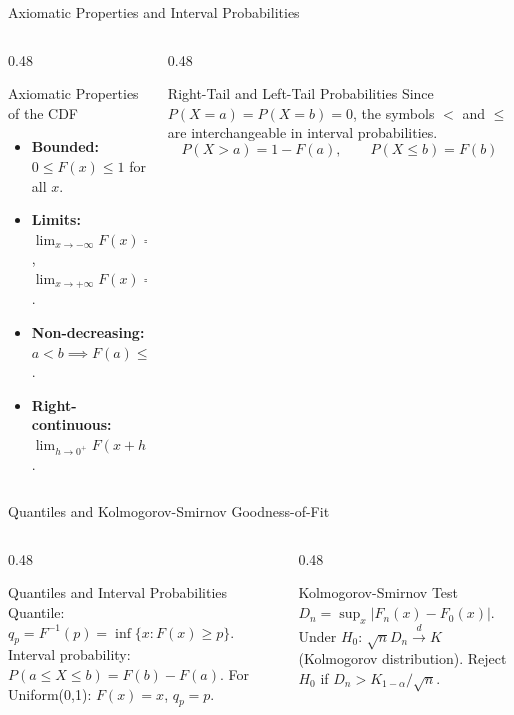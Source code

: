 \documentclass[aspectratio=169,xcolor={dvipsnames,table}]{beamer}
\begin{document}
\begin{frame}{Axiomatic Properties and Interval Probabilities}
	\vspace{-0.15cm}
	\begin{columns}[T]
		\begin{column}{0.48\textwidth}
			\begin{alertblock}{Axiomatic Properties of the CDF}
				\footnotesize
				\begin{itemize}\itemsep=0.03cm
					\item \textbf{Bounded:} $0 \le F(x) \le 1$ for all $x$.
					\item \textbf{Limits:} $\lim_{x \to -\infty} F(x) = 0$, $\lim_{x \to +\infty} F(x) = 1$.
					\item \textbf{Non-decreasing:} $a < b \implies F(a) \le F(b)$.
					\item \textbf{Right-continuous:} $\lim_{h \to 0^{+}} F(x+h) = F(x)$.
				\end{itemize}
			\end{alertblock}
		\end{column}
		\begin{column}{0.48\textwidth}
			\begin{block}{Right-Tail and Left-Tail Probabilities}
				\footnotesize
				Since $P(X=a)=P(X=b)=0$, the symbols $<$ and $\le$ are interchangeable in interval probabilities.
				$$P(X > a) = 1 - F(a), \qquad P(X \le b) = F(b)$$
			\end{block}
		\end{column}
	\end{columns}
\end{frame}

\begin{frame}{Quantiles and Kolmogorov-Smirnov Goodness-of-Fit}
	\vspace{-0.15cm}
	\begin{columns}[T]
		\begin{column}{0.48\textwidth}
			\begin{block}{Quantiles and Interval Probabilities}
				\footnotesize
				Quantile: $q_{p} = F^{-1}(p) = \inf\{x : F(x) \ge p\}$. Interval probability: $P(a \le X \le b) = F(b) - F(a)$. For Uniform(0,1): $F(x) = x$, $q_{p} = p$.
			\end{block}
		\end{column}
		\begin{column}{0.48\textwidth}
			\begin{alertblock}{Kolmogorov-Smirnov Test}
				\footnotesize
				$D_{n} = \sup_{x} |F_{n}(x) - F_{0}(x)|$. Under $H_{0}$: $\sqrt{n} D_{n} \xrightarrow{d} K$ (Kolmogorov distribution). Reject $H_{0}$ if $D_{n} > K_{1-\alpha}/\sqrt{n}$.
			\end{alertblock}
		\end{column}
	\end{columns}
\end{frame}
\end{document}
